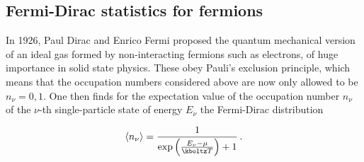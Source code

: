 \subsection*{Fermi-Dirac statistics for fermions}

In 1926, Paul Dirac and Enrico Fermi proposed the quantum mechanical version of an ideal gas formed by non-interacting fermions such as electrons, of huge importance in solid state physics. These obey Pauli's exclusion principle, which means that the occupation numbers considered above are now only allowed to be $n_\nu=0,1$. One then finds for the expectation value of the occupation number $n_\nu$ of the $\nu$-th single-particle state of energy $E_\nu$ the Fermi-Dirac distribution

\begin{equation*}
  \langle n_\nu \rangle=
    \frac{1}{\exp\left(\frac{E_\nu-\mu}{\kboltz T} \right)+1}\,.
\end{equation*}

